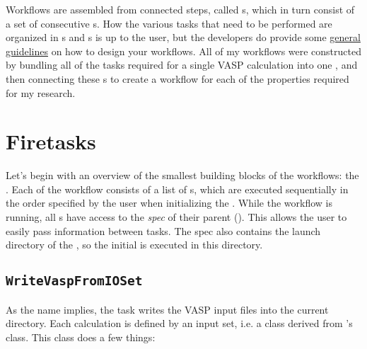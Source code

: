 \begin{refsection}
Workflows are assembled from connected steps, called 
\href{https://github.com/materialsproject/fireworks/blob/master/fireworks/core/firework.py#L196}{}s, 
which in turn consist of a set of consecutive 
\href{https://github.com/materialsproject/fireworks/blob/master/fireworks/core/firework.py#L46}{}s. 
How the various tasks that need to be performed are organized in 
s and s is up to the user, but the developers do 
provide some 
\href{https://materialsproject.github.io/fireworks/design_tips.html}{general 
guidelines} on how to design your workflows. All of my workflows were 
constructed by bundling all of the tasks required for a single \gls{VASP} 
calculation into one , and then connecting these 
s to create a workflow for each of the properties required for 
my research. 
 
\section{Firetasks} \label{automation:sec-firetasks} 
 
Let's begin with an overview of the smallest building blocks of the workflows: 
the . Each  of the workflow consists of a list 
of s, which are executed sequentially in the order specified by 
the user when initializing the . While the workflow is 
running, all s have access to the \textit{spec} of their parent 
 (). This allows the user 
to easily pass information between tasks. The spec also contains the launch 
directory of the , so the initial  is executed 
in this directory. 
 
\subsection{\texttt{WriteVaspFromIOSet}} 
\label{automation:sec-WriteVaspFromIOSet} 
 
As the name implies, the  task writes the 
\gls{VASP} input files into the current directory. Each calculation is 
defined by an input set, i.e. a class derived from 's 
 class. This class does a few things: 
 
\begin{itemize} 
 

\end{itemize}
\end{refsection}
